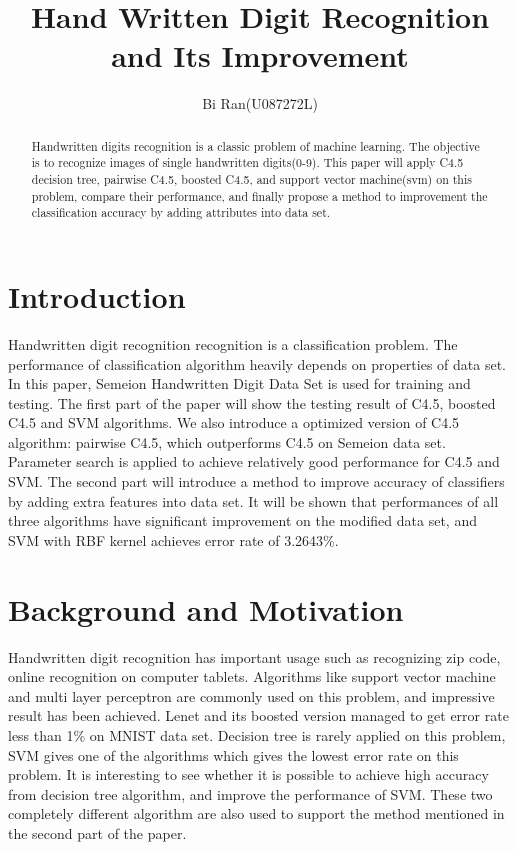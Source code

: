 \documentclass[a4paper,11pt]{article}
\author{Bi Ran(U087272L)}
\title{Hand Written Digit Recognition and Its Improvement}
\begin{document}
\maketitle
\begin{abstract}
Handwritten digits recognition is a classic problem of machine learning. The objective is to recognize images of single handwritten digits(0-9). This paper will apply C4.5 decision tree, pairwise C4.5, boosted C4.5, and support vector machine(svm) on this problem, compare their performance, and finally propose a method to improvement the classification accuracy by adding attributes into data set.
\end{abstract}
\section{Introduction}
Handwritten digit recognition recognition is a classification problem. The performance of classification algorithm heavily depends on properties of data set.
In this paper, Semeion Handwritten Digit Data Set is used for training and testing. The first part of the paper will show the testing result of C4.5, boosted C4.5 and SVM algorithms. We also introduce a optimized version of C4.5 algorithm: pairwise C4.5, which outperforms C4.5 on Semeion data set. Parameter search is applied to achieve relatively good performance for C4.5 and SVM.
The second part will introduce a method to improve accuracy of classifiers by adding extra features into data set. It will be shown that performances of all three algorithms have significant improvement on the modified data set, and SVM with RBF kernel achieves error rate of 3.2643\%.
\section{Background and Motivation}
Handwritten digit recognition has important usage such as recognizing zip code, online recognition on computer tablets. Algorithms like support vector machine and multi layer perceptron are commonly used on this problem, and impressive result has been achieved. Lenet and its boosted version managed to get error rate less than 1\% on MNIST data set\cite{kussulimprovedmethod}. Decision tree is rarely applied on this problem, SVM gives one of the algorithms which gives the lowest error rate on this problem. It is interesting to see whether it is possible to achieve high accuracy from decision tree algorithm, and improve the performance of SVM. These two completely different algorithm are also used to support the method mentioned in the second part of the paper.
\end{document}
